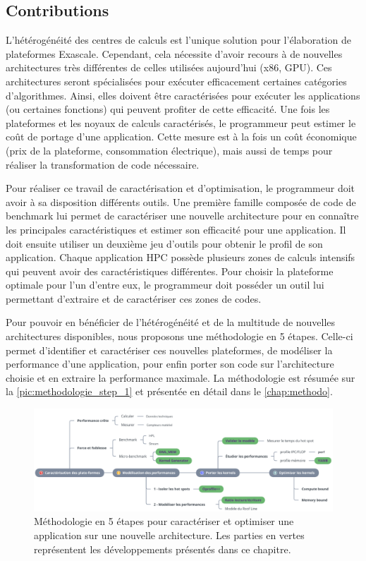  

\subsection{Contributions}

    L'hétérogénéité des centres de calculs est l'unique solution pour l'élaboration de plateformes Exascale. Cependant, cela nécessite d'avoir recours à de nouvelles architectures très différentes de celles utilisées aujourd'hui (x86, GPU). Ces architectures seront spécialisées pour exécuter efficacement certaines catégories d'algorithmes. Ainsi, elles doivent être caractérisées pour exécuter les applications (ou certaines fonctions) qui peuvent profiter de cette efficacité. Une fois les plateformes et les noyaux de calculs caractérisés, le programmeur peut estimer le coût de portage d'une application. Cette mesure est à la fois un coût économique (prix de la plateforme, consommation électrique), mais aussi de temps pour réaliser la transformation de code nécessaire.
    
    Pour réaliser ce travail de caractérisation et d'optimisation, le programmeur doit avoir à sa disposition différents outils. Une première famille composée de code de benchmark lui permet de caractériser une nouvelle architecture pour en connaître les principales caractéristiques et estimer son efficacité pour une application. 
    Il doit ensuite utiliser un deuxième jeu d'outils pour obtenir le profil de son application. Chaque application HPC possède plusieurs zones de calculs intensifs qui peuvent avoir des caractéristiques différentes. Pour choisir la plateforme optimale pour l'un d'entre eux, le programmeur doit posséder un outil lui permettant d'extraire et de caractériser ces zones de codes.
    
    Pour pouvoir en bénéficier de l'hétérogénéité et de la multitude de nouvelles architectures disponibles, nous proposons une méthodologie en 5 étapes. Celle-ci permet d'identifier et caractériser ces nouvelles plateformes, de modéliser la performance d'une application, pour enfin porter son code sur l'architecture choisie et en extraire la performance maximale. La méthodologie est résumée sur la \autoref{pic:methodologie_step_1} et présentée en détail dans le \autoref{chap:methodo}.

    \begin{figure}[h!]
    \center
    \includegraphics[width=\linewidth]{images/methodologie_step.png}
    \caption{\label{pic:methodologie_step_1} Méthodologie en 5 étapes pour caractériser et optimiser une application sur une nouvelle architecture. Les parties en vertes représentent les développements présentés dans ce chapitre.}
    \end{figure}
    

